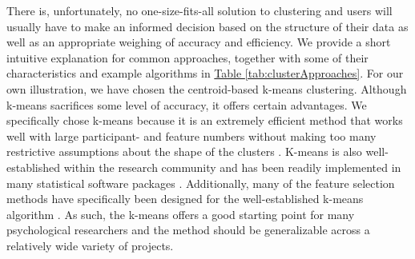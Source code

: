 \documentclass[man, 12pt, a4paper, floatsintext]{apa7}
\theoremstyle{break}
\theoremstyle{plain}
\newcommand{\tblref}[2][]{\hyperref[#2]{Table \ref*{#2}#1}}
\begin{document}
There is, unfortunately, no one-size-fits-all solution to clustering and users will usually have to make an informed decision based on the structure of their data as well as an appropriate weighing of accuracy and efficiency. We provide a short intuitive explanation for common approaches, together with some of their characteristics and example algorithms in \tblref{tab:clusterApproaches}. For our own illustration, we have chosen the centroid-based k-means clustering. Although k-means sacrifices some level of accuracy, it offers certain advantages. We specifically chose k-means because it is an extremely efficient method that works well with large participant- and feature numbers without making too many restrictive assumptions about the shape of the clusters \citep{jain2010}. K-means is also well-established within the research community and has been readily implemented in many statistical software packages \citep{hand2005}. Additionally, many of the feature selection methods have specifically been designed for the well-established k-means algorithm \citep[e.g.,][]{boutsidis2010}. As such, the k-means offers a good starting point for many psychological researchers and the method should be generalizable across a relatively wide variety of projects.

\end{document}
